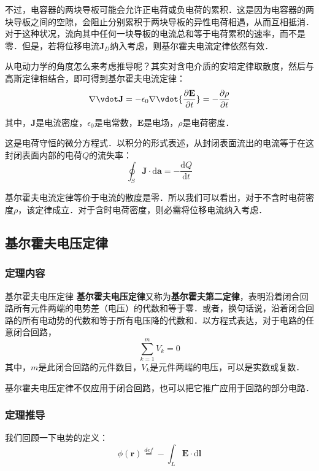 不过，电容器的两块导板可能会允许正电荷或负电荷的累积．这是因为电容器的两块导板之间的空隙，会阻止分别累积于两块导板的异性电荷相遇，从而互相抵消．对于这种状况，流向其中任何一块导板的电流总和等于电荷累积的速率，而不是零．但是，若将位移电流$\mathbf{J}_D$纳入考虑，则基尔霍夫电流定律依然有效．

从电动力学的角度怎么来考虑推导呢？其实对含电介质的安培定律取散度，然后与高斯定律相结合，即可得到基尔霍夫电流定律：
\begin{equation}
\nabla \vdot \mathbf {J} =-\epsilon _{0}\nabla \vdot {\frac {\partial \mathbf {E} }{\partial t}}=-{\frac {\partial \rho }{\partial t}}
\end{equation}
 
其中，$\mathbf{J}$是电流密度，$\epsilon_0$是电常数，$\mathbf{E}$是电场，$\rho$是电荷密度．

这是电荷守恒的微分方程式．以积分的形式表述，从封闭表面流出的电流等于在这封闭表面内部的电荷$Q$的流失率：
\begin{equation}
\oint _{S}\mathbf {J} \cdot \mathrm {d} \mathbf {a} =-{\frac {\mathrm {d} Q}{\mathrm {d} t}}
\end{equation}

基尔霍夫电流定律等价于电流的散度是零．所以我们可以看出，对于不含时电荷密度$\rho$，该定律成立．对于含时电荷密度，则必需将位移电流纳入考虑．

\subsection{基尔霍夫电压定律}
\subsubsection{定理内容}
\begin{theorem}{基尔霍夫电压定律}
\textbf{基尔霍夫电压定律}又称为\textbf{基尔霍夫第二定律}，表明沿着闭合回路所有元件两端的电势差（电压）的代数和等于零．或者，换句话说，沿着闭合回路的所有电动势的代数和等于所有电压降的代数和．以方程式表达，对于电路的任意闭合回路，
\begin{equation}
\sum_{k=1}^m V_k = 0
\end{equation}
其中，$m$是此闭合回路的元件数目，$V_k$是元件两端的电压，可以是实数或复数．
\end{theorem}

基尔霍夫电压定律不仅应用于闭合回路，也可以把它推广应用于回路的部分电路．

\subsubsection{定理推导}
我们回顾一下电势的定义：
\begin{equation}
\phi(\mathbf{r})\stackrel{def}{=} - \int_{L} \mathbf{E} \cdot \mathrm{d} \mathbf{l}
\end{equation}

